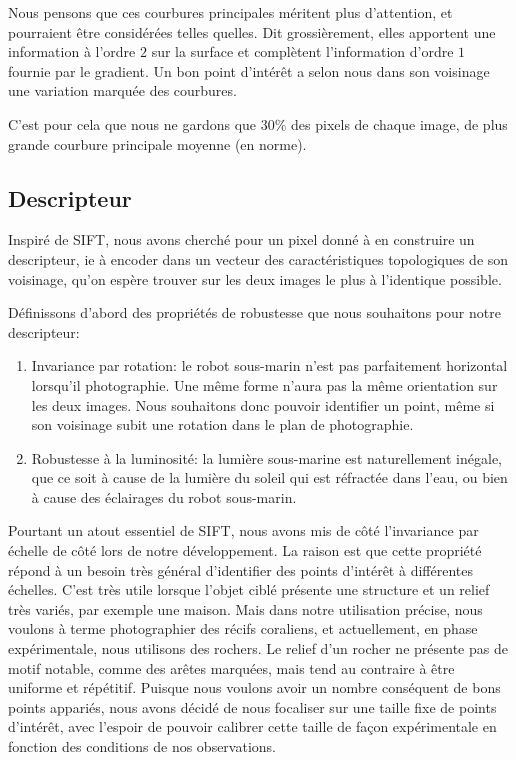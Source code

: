\documentclass[
	a4paper, %
	10pt, %
	unnumberedsections, %
	twoside, %
]{LTJournalArticle}
\begin{document}
Nous pensons que ces courbures principales méritent plus d'attention,
et pourraient être considérées telles quelles. Dit grossièrement,
elles apportent une information à l'ordre $2$ sur la surface et complètent
l'information d'ordre $1$ fournie par le gradient. Un bon
point d'intérêt a selon nous dans son voisinage une variation marquée des courbures.


C'est pour cela que nous ne gardons que $30 \%$ des pixels de chaque image,
de plus grande courbure principale moyenne (en norme).

\subsection{Descripteur}
Inspiré de SIFT, nous avons cherché pour un pixel donné à en construire un descripteur,
ie à encoder dans un vecteur des caractéristiques topologiques de son voisinage, qu'on espère trouver
sur les deux images le plus à l'identique possible.

Définissons d'abord des propriétés de robustesse
que nous souhaitons pour notre descripteur:

\begin{enumerate}
	\item Invariance par rotation: le robot sous-marin n'est pas parfaitement
	      horizontal lorsqu'il photographie. Une même forme n'aura pas la même
	      orientation sur les deux images. Nous souhaitons donc pouvoir identifier un
	      point, même si son voisinage subit une rotation dans le plan de photographie.
	\item Robustesse à la luminosité: la lumière sous-marine est naturellement inégale,
	      que ce soit à cause de la lumière du soleil qui est réfractée dans l'eau, ou bien à
	      cause des éclairages du robot sous-marin.
\end{enumerate}

Pourtant un atout essentiel de SIFT, nous avons mis de côté l'invariance par échelle
de côté lors de notre développement. La raison est que cette propriété
répond à un besoin très général d'identifier des points d'intérêt à différentes
échelles. C'est très utile lorsque l'objet ciblé présente une structure et
un relief très variés, par exemple une maison. Mais dans notre utilisation précise,
nous voulons à terme photographier des récifs coraliens, et actuellement, en
phase expérimentale, nous utilisons des rochers. Le relief d'un rocher ne présente
pas de motif notable, comme des arêtes marquées, mais tend au contraire à être
uniforme et répétitif. Puisque nous voulons avoir un nombre conséquent de bons points
appariés, nous avons décidé de nous focaliser sur une taille fixe de points d'intérêt,
avec l'espoir de pouvoir calibrer cette taille de façon expérimentale en fonction
des conditions de nos observations.
\end{document}
